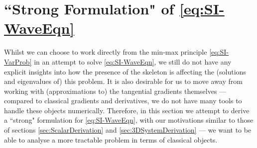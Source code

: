 \section{``Strong Formulation" of \eqref{eq:SI-WaveEqn}} \label{sec:SI-StrongDerivation}
Whilst we can choose to work directly from the min-max principle \eqref{eq:SI-VarProb} in an attempt to solve \eqref{eq:SI-WaveEqn}, we still do not have any explicit insights into how the presence of the skeleton is affecting the (solutions and eigenvalues of) this problem.
It is also desirable for us to move away from working with (approximations to) the tangential gradients themselves --- compared to classical gradients and derivatives, we do not have many tools to handle these objects numerically.
Therefore, in this section we attempt to derive a ``strong" formulation for \eqref{eq:SI-WaveEqn}, with our motivations similar to those of sections \ref{sec:ScalarDerivation} and \ref{sec:3DSystemDerivation} --- we want to be able to analyse a more tractable problem in terms of classical objects.

